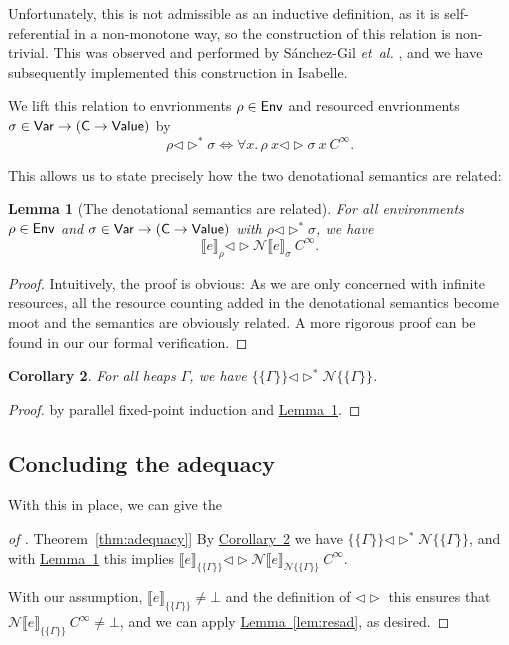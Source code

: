 \documentclass{jfp1}
\newcommand{\myref}[2]{\hyperref[#2]{#1~\ref*{#2}}}
\newtheorem{lemma}{Lemma}
\newtheorem{corollary}[lemma]{Corollary}
\theoremstyle{nonumberbreak}
\newtheorem{proof}{Proof}
\newcommand{\sVar}   {\text{\textsf{Var}}}
\newcommand{\sValue} {\text{\textsf{Value}}}
\newcommand{\sEnv}   {\text{\textsf{Env}}}
\newcommand{\sC}     {\text{\textsf{C}}}
\newcommand{\dsem}[2]{\llbracket #1 \rrbracket_{#2}}
\newcommand{\esem}[1]{\{\!\!\!\{#1\}\!\!\!\}}
\newcommand{\dsemr}[2]{\mathcal N\!\llbracket #1 \rrbracket_{#2}}
\newcommand{\esemr}[1]{\mathcal N\!\!\{\!\!\!\{#1\}\!\!\!\}}
\newcommand{\dsim}{\mathrel{\triangleleft\triangleright}}
\newcommand{\dsimheap}{\mathrel{\triangleleft\triangleright^*}}
\begin{document}
Unfortunately, this is not admissible as an inductive definition, as it is self-referential in a non-monotone way, so the construction of this relation is non-trivial. This was observed and performed by S{\'a}nchez-Gil {\em et~al.} , and we have subsequently implemented this construction in Isabelle.

We lift this relation to envrionments $\rho \in \sEnv$ and resourced envrionments $\sigma \in \sVar \to (\sC \to \sValue)$ by
\[
\rho \dsimheap \sigma \iff \forall x.\, \rho~x \dsim \sigma~x~C^\infty.
\]

This allows us to state precisely how the two denotational semantics are related:

\begin{lemma}[The denotational semantics are related]
\label{lem:denrel}
For all environments $\rho \in \sEnv$ and $\sigma \in \sVar \to (\sC \to \sValue)$ with $\rho \dsimheap \sigma$, we have
\[
\dsem e \rho \dsim \dsemr e \sigma~{C^\infty}.
\]
\end{lemma}

\begin{proof}
Intuitively, the proof is obvious: As we are only concerned with infinite resources, all the resource counting added in the denotational semantics become moot and the semantics are obviously related. A more rigorous proof can be found in \cite{functionspaces} our our formal verification.
\end{proof}

\begin{corollary}
For all heaps $\Gamma$, we have $\esem{\Gamma}\dsimheap \esemr{\Gamma}$.
\label{lem:denrelheap}
\end{corollary}

\begin{proof}
by parallel fixed-point induction and \myref{Lemma}{lem:denrel}.
\end{proof}

\subsection{Concluding the adequacy}

With this in place, we can give the
\begin{proof}[of \myref{Theorem}{thm:adequacy}]
By \myref{Corollary}{lem:denrelheap} we have $\esem{\Gamma}\dsimheap \esemr{\Gamma}$, and with \myref{Lemma}{lem:denrel} this implies $\dsem{e}{\esem{\Gamma}} \dsim \dsemr{e}{\esemr{\Gamma}}~C^\infty$.

With our assumption, $\dsem{e}{\esem{\Gamma}} \ne \bot$ and the definition of $\dsim$ this ensures that $\dsemr{e}{\esem{\Gamma}}~C^\infty \ne \bot$, and we can apply \myref{Lemma}{lem:resad}, as desired.
\end{proof}
\end{document}
